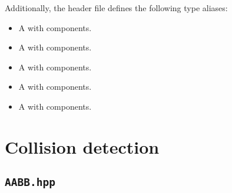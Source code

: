 \documentclass[a4paper,onecolumn,11pt]{doofus}
\begin{document}
Additionally, the header file defines the following type aliases:

\begin{itemize}
\item {} A  with  components.
\item {} A  with  components.
\item {} A  with  components.
\item {} A  with  components.
\item {} A  with  components.
\end{itemize}



\section{Collision detection}

\subsection{\texttt{AABB.hpp}}
\end{document}
